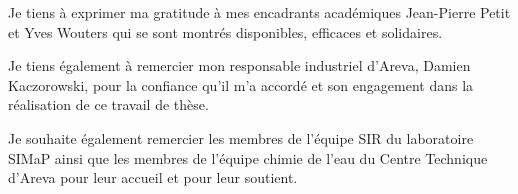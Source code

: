 
\begin{acknowledgement}
	
Je tiens à exprimer ma gratitude à mes encadrants académiques Jean-Pierre Petit et Yves
Wouters qui se sont montrés disponibles, efficaces et solidaires.
 
Je tiens également à remercier mon responsable industriel d'Areva, Damien Kaczorowski, pour la confiance qu'il m'a
accordé et son engagement dans la réalisation de ce travail de thèse. 

Je souhaite également remercier les membres de l'équipe SIR du laboratoire SIMaP ainsi
que les membres de l'équipe chimie de l'eau du Centre Technique d'Areva pour leur accueil et pour leur soutient.



\end{acknowledgement}
